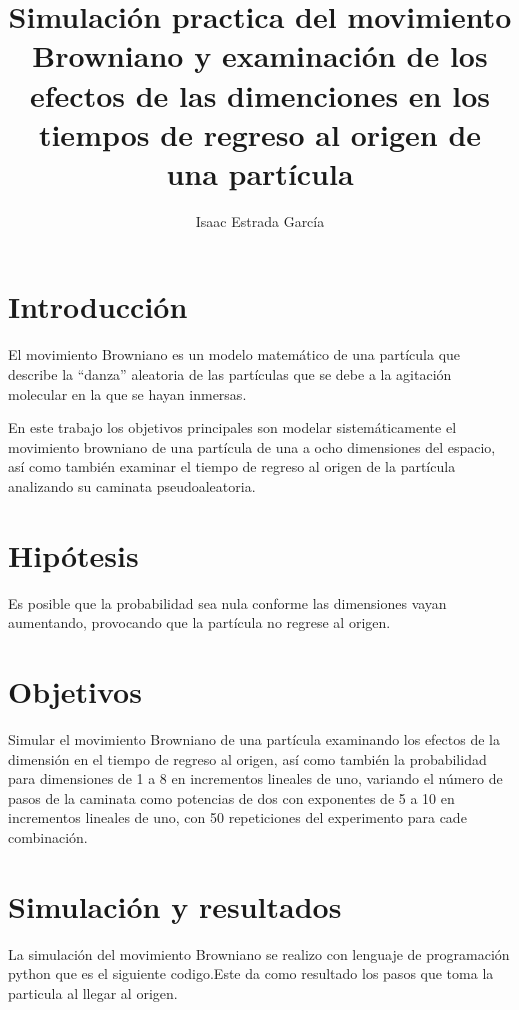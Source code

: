 \documentclass{article}
\title{Simulaci\'{o}n practica del movimiento Browniano y examinaci\'{o}n de los efectos de las dimenciones en los tiempos de regreso al origen de una part\'{i}cula}
\author{Isaac Estrada Garc\'{i}a }
\begin{document}
\maketitle

\section{Introducci\'{o}n}
El movimiento Browniano es un modelo matem\'{a}tico de una part\'{i}cula que describe la ``danza'' aleatoria de las part\'{i}culas que se debe a la agitaci\'{o}n molecular en la que se hayan inmersas.

En este trabajo los objetivos principales son modelar sistem\'{a}ticamente el movimiento browniano de una part\'{i}cula de una a ocho dimensiones del espacio, as\'{i} como tambi\'{e}n examinar el tiempo de regreso al origen de la part\'{i}cula analizando su caminata pseudoaleatoria.

\section{Hip\'{o}tesis}
Es posible que la probabilidad sea nula conforme las dimensiones vayan aumentando, provocando que la part\'{i}cula no regrese al origen.
\section{Objetivos}
Simular el movimiento Browniano de una part\'{i}cula examinando los efectos de la dimensi\'{o}n en el tiempo de regreso al origen, as\'{i} como tambi\'{e}n la probabilidad para dimensiones de 1 a 8 en incrementos lineales de uno, variando el n\'{u}mero de pasos de la caminata como potencias de dos con exponentes de 5 a 10 en incrementos lineales de uno, con 50 repeticiones del experimento para cade combinaci\'{o}n. 
\section{Simulaci\'{o}n y resultados}

La simulaci\'{o}n del movimiento Browniano se realizo con lenguaje de programaci\'{o}n python que es el siguiente codigo.Este da como resultado los pasos que toma la particula al llegar al origen.
\end{document}
